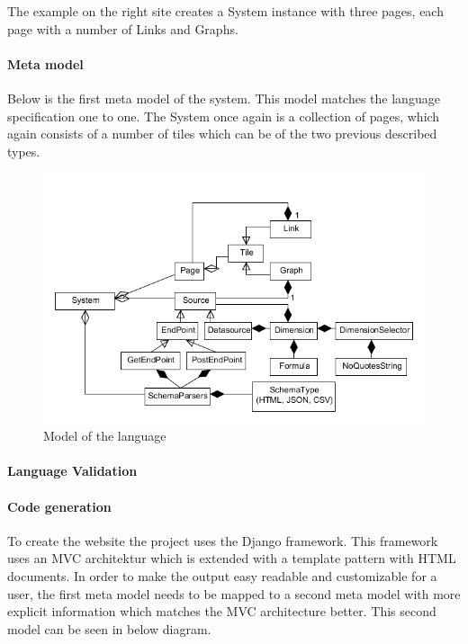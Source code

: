 
The example on the right site creates a System instance with three pages, each page with a number of Links and Graphs.

\paragraph{Meta model}
Below is the first meta model of the system. 
This model matches the language specification one to one. 
The System once again is a collection of pages, which again consists of a number of tiles which can be of the two previous described types. 

\begin{figure}
\begin{center}
\includegraphics[width=\linewidth]{images/languagemodel}
\end{center}
\caption{Model of the language}
\label{fig:languagemodel}
\end{figure}

\paragraph{Language Validation}

\paragraph{Code generation}
To create the website the project uses the Django framework. 
This framework uses an MVC architektur which is extended with a template pattern with HTML documents. 
In order to make the output easy readable and customizable for a user, the first meta model needs to be mapped to a second meta model with more explicit information which matches the MVC architecture better.
This second model can be seen in below diagram. 

